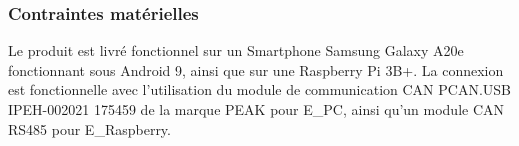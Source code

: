 \subsubsection{Contraintes matérielles}
Le produit est livré fonctionnel sur un Smartphone Samsung Galaxy A20e fonctionnant sous Android 9, ainsi que sur une Raspberry Pi 3B+. La connexion est fonctionnelle avec l'utilisation du module de communication CAN PCAN.USB IPEH-002021 175459 de la marque PEAK pour E\_PC, ainsi qu'un module CAN RS485 pour E\_Raspberry.